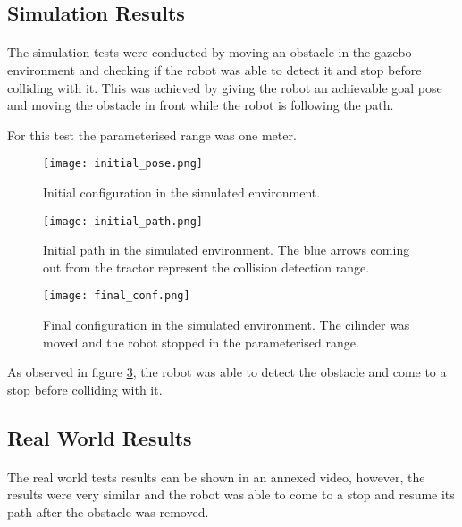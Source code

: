 \subsection{Simulation Results}
\paragraph{} The simulation tests were conducted by moving an obstacle in the 
gazebo environment and checking if the robot was able to detect it and stop 
before colliding with it. This was achieved by giving the robot an achievable 
goal pose and moving the obstacle in front while the robot is following the path.

For this test the parameterised range was one meter.

\begin{figure}[h]
    \centering
    \texttt{[image: initial\_pose.png]}
    \caption{Initial configuration in the simulated environment.}
    \label{fig:sim_obstacle_detection1}
\end{figure}
\begin{figure}[h]
    \centering
    \texttt{[image: initial\_path.png]}
    \caption{Initial path in the simulated environment. The blue arrows coming out from the tractor represent the collision detection range.}
    \label{fig:sim_obstacle_detection2}
\end{figure}
\clearpage
\begin{figure}[h]
    \centering
    \texttt{[image: final\_conf.png]}
    \caption{Final configuration in the simulated environment. The cilinder was moved and the robot stopped in the parameterised range.}
    \label{fig:sim_obstacle_detection3}
\end{figure}

As observed in figure \ref{fig:sim_obstacle_detection3}, the robot was able to 
detect the obstacle and come to a stop before colliding with it.
\subsection{Real World Results}
\paragraph{} The real world tests results can be shown in an annexed video, however, 
the results were very similar and the robot was able to come to a stop and resume its 
path after the obstacle was removed.


